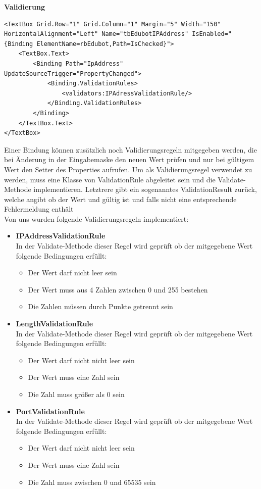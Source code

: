 \textbf{Validierung}\\
\begin{lstlisting}[language = XAML, captionpos=b, caption={IP-Addresse - TextBox mit IPAddressValidationRule}]
<TextBox Grid.Row="1" Grid.Column="1" Margin="5" Width="150" HorizontalAlignment="Left" Name="tbEdubotIPAddress" IsEnabled="{Binding ElementName=rbEdubot,Path=IsChecked}">
	<TextBox.Text>
		<Binding Path="IpAddress" UpdateSourceTrigger="PropertyChanged">
			<Binding.ValidationRules>
				<validators:IPAdressValidationRule/>
			</Binding.ValidationRules>
		</Binding>
	</TextBox.Text>
</TextBox>
\end{lstlisting}
Einer Bindung können zusätzlich noch Validierungsregeln mitgegeben werden, die bei Änderung in der Eingabemaske den neuen Wert prüfen und nur bei gültigem Wert den Setter des Properties aufrufen. Um als Validierungsregel verwendet zu werden, muss eine Klasse von ValidationRule abgeleitet sein und die Validate-Methode implementieren. Letztrere gibt ein sogenanntes ValidationResult zurück, welche angibt ob der Wert und gültig ist und falls nicht eine entsprechende Fehlermeldung enthält\\
Von uns wurden folgende Validierungsregeln implementiert:
\begin{itemize}
\item \textbf{IPAddressValidationRule}\\
In der Validate-Methode dieser Regel wird geprüft ob der mitgegebene Wert folgende Bedingungen erfüllt:
\begin{itemize}
\item Der Wert darf nicht leer sein
\item Der Wert muss aus 4 Zahlen zwischen 0 und 255 bestehen
\item Die Zahlen müssen durch Punkte getrennt sein
\end{itemize}
\item \textbf{LengthValidationRule}\\
In der Validate-Methode dieser Regel wird geprüft ob der mitgegebene Wert folgende Bedingungen erfüllt:
\begin{itemize}
\item Der Wert darf nicht nicht leer sein
\item Der Wert muss eine Zahl sein
\item Die Zahl muss größer als 0 sein
\end{itemize}
\item \textbf{PortValidationRule}\\
In der Validate-Methode dieser Regel wird geprüft ob der mitgegebene Wert folgende Bedingungen erfüllt:
\begin{itemize}
\item Der Wert darf nicht nicht leer sein
\item Der Wert muss eine Zahl sein
\item Die Zahl muss zwischen 0 und 65535 sein
\end{itemize}
\end{itemize}
